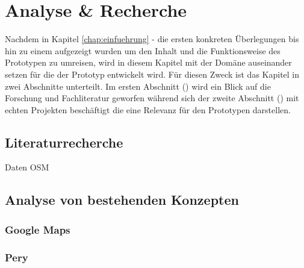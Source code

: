 \documentclass[../Bachelorarbeit.tex]{subfiles}
\begin{document}
\chapter{Analyse \& Recherche}
\label{chap:analyse}

Nachdem in Kapitel \ref{chap:einfuehrung} -  die ersten konkreten Überlegungen bis hin zu einem  aufgezeigt wurden um den Inhalt und die Funktionsweise des Prototypen zu umreisen, wird in diesem Kapitel mit der Domäne auseinander setzen für die der Prototyp entwickelt wird.
Für diesen Zweck ist das Kapitel in zwei Abschnitte unterteilt. 
Im ersten Abschnitt () wird ein Blick auf die Forschung und Fachliteratur geworfen während sich der zweite Abschnitt () mit echten Projekten beschäftigt die eine Relevanz für den Prototypen darstellen.


\section{Literaturrecherche}
\label{chap:analyse:sec:sota}





Daten OSM


\section{Analyse von bestehenden Konzepten}
\label{chap:analyse:sec:analyBestehendeKonz}


\subsection{Google Maps}
\label{chap:analyse:sec:sota:sec:google_maps}

\subsection{Pery}
\end{document}

